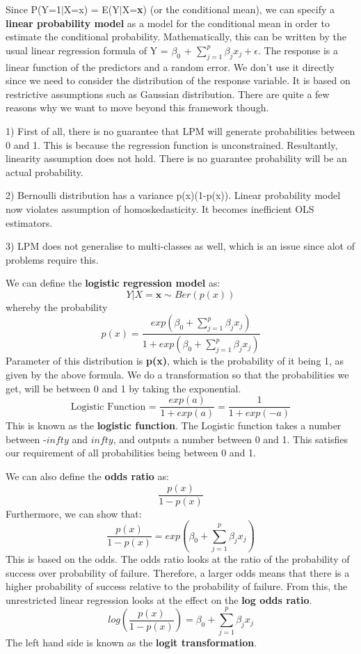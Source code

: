 \documentclass[11pt, oneside]{article}
\theoremstyle{definition}
\begin{document}
Since P(Y=1$|$X=x) = E(Y$|$X=\textbf{x}) (or the conditional mean), we can specify a \textbf{linear probability model} as a model for the conditional mean in order to estimate the conditional probability. Mathematically, this can be written by the usual linear regression formula of Y = $\beta_0$ + $\sum_{j=1}^{p}\beta_jx_j + \epsilon$. The response is a linear function of the predictors and a random error. We don't use it directly since we need to consider the distribution of the response variable. It is based on restrictive assumptions such as Gaussian distribution. There are quite a few reasons why we want to move beyond this framework though.

1) First of all, there is no guarantee that LPM will generate probabilities between 0 and 1. This is because the regression function is unconstrained. Resultantly, linearity assumption does not hold. There is no guarantee probability will be an actual probability.

2) Bernoulli distribution has a variance p(x)(1-p(x)). Linear probability model now violates assumption of homoskedasticity. It becomes inefficient OLS estimators.

3) LPM does not generalise to multi-classes as well, which is an issue since alot of problems require this.

We can define the \textbf{logistic regression model} as:
$$
Y|X = \bm{x} \sim Ber(p(x))
$$
whereby the probability
$$
p(x) = \frac{exp(\beta_0 + \sum_{j=1}^{p}\beta_jx_j)}{1 + exp(\beta_0 + \sum_{j=1}^{p}\beta_jx_j)}
$$
Parameter of this distribution is \textbf{p(x)}, which is the probability of it being 1, as given by the above formula. We do a transformation so that the probabilities we get, will be between 0 and 1 by taking the exponential.
$$
\text{Logistic Function = }\frac{exp(a)}{1 + exp(a)} = \frac{1}{1 + exp(-a)}
$$
This is known as the \textbf{logistic function}. The Logistic function takes a number between -$infty$ and $infty$, and outputs a number between 0 and 1. This satisfies our requirement of all probabilities being between 0 and 1.

We can also define the \textbf{odds ratio} as:
$$
  \frac{p(x)}{1-p(x)}
$$
Furthermore, we can show that:
$$
\frac{p(x)}{1-p(x)} = exp(\beta_0 + \sum_{j=1}^{p}\beta_jx_j)
$$
This is based on the odds. The odds ratio looks at the ratio of the probability of success over probability of failure. Therefore, a larger odds means that there is a higher probability of success relative to the probability of failure. From this, the unrestricted linear regression looks at the effect on the \textbf{log odds ratio}.
$$
log(\frac{p(x)}{1-p(x)}) = \beta_0 + \sum_{j=1}^{p}\beta_jx_j
$$
The left hand side is known as the \textbf{logit transformation}.
\end{document}
